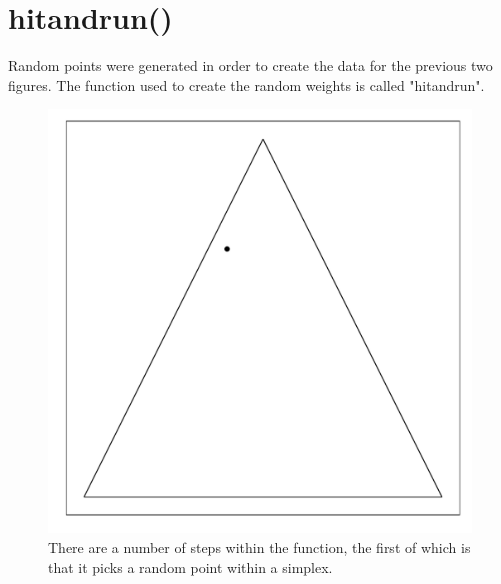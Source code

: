 \documentclass{article}\usepackage{graphicx, color}
\makeatletter
\def\maxwidth{ %
  \ifdim\Gin@nat@width>\linewidth
    \linewidth
  \else
    \Gin@nat@width
  \fi
}
\newenvironment{knitrout}{}{} %
\makeatother
\begin{document}
\section*{hitandrun()}

Random points were generated in order to create the data for the previous two figures. The function used to create the random weights is called "hitandrun".

\begin{figure}[H]
\begin{knitrout}
\color{fgcolor}
\includegraphics[width=\maxwidth]{figure/hitandrun_walkthrough1} 

\end{knitrout}

\caption{There are a number of steps within the function, the first of which is that it picks a random point within a simplex.}
\end{figure}
\end{document}
